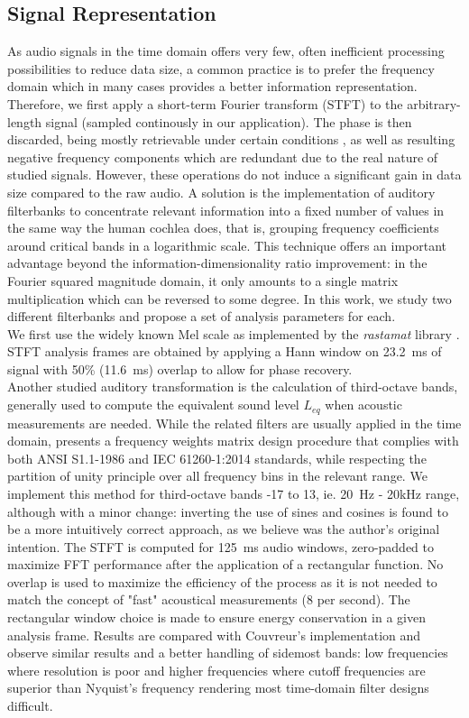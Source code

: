 \documentclass[final,3p,times,twocolumn]{elsarticle}
\begin{document}
\subsection{Signal Representation}
As audio signals in the time domain offers very few, often inefficient processing possibilities to reduce data size, a common practice is to prefer the frequency domain which in many cases provides a better information representation. Therefore, we first apply a short-term Fourier transform (STFT) to the arbitrary-length signal (sampled continously in our application). The phase is then discarded, being mostly retrievable under certain conditions \cite{nawab1983}, as well as resulting negative frequency components which are redundant due to the real nature of studied signals. However, these operations do not induce a significant gain in data size compared to the raw audio. A solution is the implementation of auditory filterbanks to concentrate relevant information into a fixed number of values in the same way the human cochlea does, that is, grouping frequency coefficients around critical bands in a logarithmic scale. This technique offers an important advantage beyond the information-dimensionality ratio improvement: in the Fourier squared magnitude domain, it only amounts to a single matrix multiplication which can be reversed to some degree. In this work, we study two different filterbanks and propose a set of analysis parameters for each.\\

We first use the widely known Mel scale as implemented by the \textit{rastamat} library \cite{ellis2005}. STFT analysis frames are obtained by applying a Hann window on 23.2~ms of signal with 50\% (11.6~ms) overlap to allow for phase recovery.\\

Another studied auditory transformation is the calculation of third-octave bands, generally used to compute the equivalent sound level $L_{eq}$ when acoustic measurements are needed. While the related filters are usually applied in the time domain, \cite{antoni2010} presents a frequency weights matrix design procedure that complies with both ANSI S1.1-1986 and IEC 61260-1:2014 standards, while respecting the partition of unity principle over all frequency bins in the relevant range. We implement this method for third-octave bands -17 to 13, ie. 20~Hz - 20kHz range, although with a minor change: inverting the use of sines and cosines is found to be a more intuitively correct approach, as we believe was the author's original intention. The STFT is computed for 125~ms audio windows, zero-padded to maximize FFT performance after the application of a rectangular function. No overlap is used to maximize the efficiency of the process as it is not needed to match the concept of "fast" acoustical measurements (8 per second). The rectangular window choice is made to ensure energy conservation in a given analysis frame. Results are compared with Couvreur's implementation \cite{couvreur} and observe similar results and a better handling of sidemost bands: low frequencies where resolution is poor and higher frequencies where cutoff frequencies are superior than Nyquist's frequency rendering most time-domain filter designs difficult.\\
\end{document}
